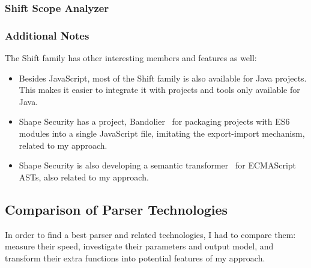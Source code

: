 \subsubsection{Shift Scope Analyzer}

\subsubsection{Additional Notes}
The Shift family has other interesting members and features as well:

\begin{itemize}[topsep=0pt]
	\item Besides JavaScript, most of the Shift family is also available for Java projects. This makes it easier to integrate it with projects and tools only available for Java.

	\item Shape Security has a project, Bandolier~\cite{bandolier} for packaging projects with ES6 modules into a single JavaScript file, imitating the export-import mechanism, related to my approach.

	\item Shape Security is also developing a semantic transformer~\cite{shift-semantics-java} for ECMAScript ASTs, also related to my approach.
\end{itemize}

\subsection{Comparison of Parser Technologies}
\label{sect:comparison-of-parser-technologies}
In order to find a best parser and related technologies, I had to compare them: measure their speed, investigate their parameters and output model, and transform their extra functions into potential features of my approach.

